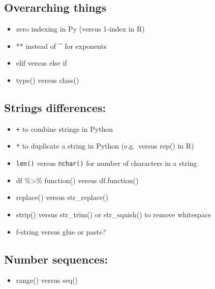 \documentclass[
]{book}
\providecommand{\tightlist}{%
  \setlength{\itemsep}{0pt}\setlength{\parskip}{0pt}}
\begin{document}
\hypertarget{overarching-things}{%
\subsection{Overarching things}\label{overarching-things}}

\begin{itemize}
\tightlist
\item
  zero indexing in Py (versus 1-index in R)
\item
  ** instead of \^{} for exponents
\item
  elif versus else if
\item
  type() versus class()
\end{itemize}

\hypertarget{strings-differences}{%
\subsection{Strings differences:}\label{strings-differences}}

\begin{itemize}
\tightlist
\item
  \texttt{+} to combine strings in Python
\item
  \texttt{*} to duplicate a string in Python (e.g.~versus rep() in R)
\item
  \texttt{len()} versus \texttt{nchar()} for number of characters in a string
\item
  df \%\textgreater\% function() versus df.function()
\item
  replace() versus str\_replace()
\item
  strip() versus str\_trim() or str\_squish() to remove whitespace
\item
  f-string versus glue or paste?
\end{itemize}

\hypertarget{number-sequences}{%
\subsection{Number sequences:}\label{number-sequences}}

\begin{itemize}
\tightlist
\item
  range() versus seq()
\end{itemize}

  
\end{document}
